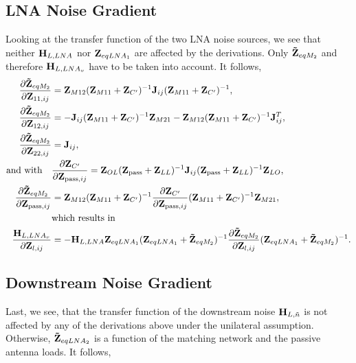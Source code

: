 \subsection{LNA Noise Gradient}
\label{sec:lna_noise_grad}

Looking at the transfer function of the two LNA noise sources, we see that neither $\mathbf{H}_{L,LNA}$ nor $\mathbf{Z}_{eqLNA_1}$ are affected by the derivations.
Only $\mathbf{\tilde{Z}}_{eqM_2}$ and therefore $\mathbf{H}_{L,LNA_v}$ have to be taken into account.
It follows,
\begin{align}
\label{eq:HLNAM_sig_grad}
\frac{\partial\mathbf{\tilde{Z}}_{eqM_2}}{\partial\mathbf{Z}_{11,ij}}&=
\mathbf{Z}_{M12}(\mathbf{Z}_{M11} + \mathbf{Z}_{C'})^{-1}\mathbf{J}_{ij}(\mathbf{Z}_{M11} + \mathbf{Z}_{C'})^{-1},\\
\frac{\partial\mathbf{\tilde{Z}}_{eqM_2}}{\partial\mathbf{Z}_{12,ij}}&=
-\mathbf{J}_{ij}(\mathbf{Z}_{M11} + \mathbf{Z}_{C'})^{-1}\mathbf{Z}_{M21} - \mathbf{Z}_{M12}(\mathbf{Z}_{M11} + \mathbf{Z}_{C'})^{-1}\mathbf{J}_{ij}^T,\\
\frac{\partial\mathbf{\tilde{Z}}_{eqM_2}}{\partial\mathbf{Z}_{22,ij}}&=\mathbf{J}_{ij},\\\nonumber
\text{and with}\quad&\frac{\partial\mathbf{Z}_{C'}}{\partial\mathbf{Z}_{\text{pass},ij}} = 
\mathbf{Z}_{OL}(\mathbf{Z}_{\text{pass}}+\mathbf{Z}_{LL})^{-1}\mathbf{J}_{ij}(\mathbf{Z}_{\text{pass}}+\mathbf{Z}_{LL})^{-1}\mathbf{Z}_{LO},\\
\frac{\partial\mathbf{\tilde{Z}}_{eqM_2}}{\partial\mathbf{Z}_{\text{pass},ij}}&=
\mathbf{Z}_{M12}(\mathbf{Z}_{M11} + \mathbf{Z}_{C'})^{-1}\frac{\partial\mathbf{Z}_{C'}}{\partial\mathbf{Z}_{\text{pass},ij}}(\mathbf{Z}_{M11} + \mathbf{Z}_{C'})^{-1}\mathbf{Z}_{M21},\\\nonumber\qquad&\text{which results in}\\
\frac{\mathbf{H}_{L,LNA_v}}{\partial\mathbf{Z}_{l,ij}}&=-\mathbf{H}_{L,LNA}\mathbf{Z}_{eqLNA_1}(\mathbf{Z}_{eqLNA_1} + \mathbf{\tilde{Z}}_{eqM_2})^{-1}\frac{\partial\mathbf{\tilde{Z}}_{eqM_2}}{\partial\mathbf{Z}_{l,ij}}(\mathbf{Z}_{eqLNA_1} + \mathbf{\tilde{Z}}_{eqM_2})^{-1}.
\label{eq:HLNAM_sig_grad_22}
\end{align}


\subsection{Downstream Noise Gradient}
\label{sec:down_noise_grad}
Last, we see, that the transfer function of the downstream noise $\mathbf{H}_{L,\tilde{n}}$ is not affected by any of the derivations above under the unilateral assumption.
Otherwise, $\mathbf{\tilde{Z}}_{eqLNA_2}$ is a function of the matching network and the passive antenna loads. It follows,

